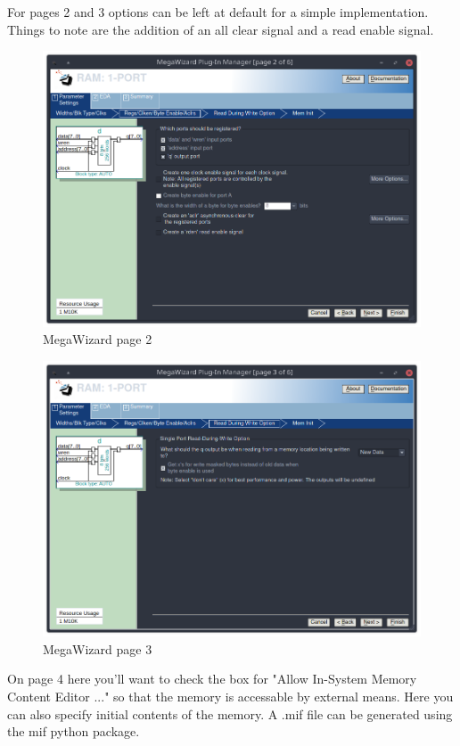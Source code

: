 \documentclass[letter,12pt]{article}
\begin{document}
For pages 2 and 3 options can be left at default for a simple implementation. Things to note are the addition of an  all clear signal and a read enable signal. 
\begin{figure}[H]
  \centering
  \includegraphics[width=.83\linewidth]{pics/Mega2.png}
  \caption{MegaWizard page 2}
\end{figure}
\begin{figure}[H]
  \centering
  \includegraphics[width=.83\linewidth]{pics/Mega3.png}
  \caption{MegaWizard page 3}
\end{figure}

On page 4 here you'll want to check the box for "Allow In-System Memory Content Editor ..." so that the memory is accessable by external means. Here you can also specify initial contents of the memory. A .mif file can be generated using the mif python package.
\end{document}
